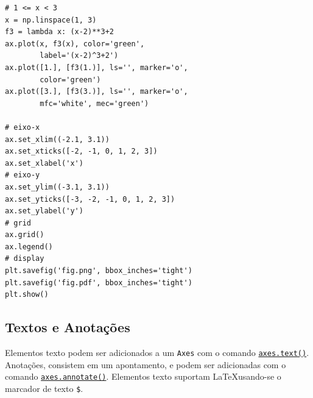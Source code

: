 \begin{ex}
\begin{lstlisting}
# 1 <= x < 3
x = np.linspace(1, 3)
f3 = lambda x: (x-2)**3+2
ax.plot(x, f3(x), color='green',
        label='(x-2)^3+2')
ax.plot([1.], [f3(1.)], ls='', marker='o',
        color='green')
ax.plot([3.], [f3(3.)], ls='', marker='o',
        mfc='white', mec='green')

# eixo-x
ax.set_xlim((-2.1, 3.1))
ax.set_xticks([-2, -1, 0, 1, 2, 3])
ax.set_xlabel('x')
# eixo-y
ax.set_ylim((-3.1, 3.1))
ax.set_yticks([-3, -2, -1, 0, 1, 2, 3])
ax.set_ylabel('y')
# grid
ax.grid()
ax.legend()
# display
plt.savefig('fig.png', bbox_inches='tight')
plt.savefig('fig.pdf', bbox_inches='tight')
plt.show()
\end{lstlisting}
\end{ex}

\subsection{Textos e Anotações}

Elementos texto podem ser adicionados a um \lstinline+Axes+ com o comando \href{https://matplotlib.org/stable/api/_as_gen/matplotlib.axes.Axes.text.html#matplotlib.axes.Axes.text}{\lstinline+axes.text()+}. Anotações, consistem em um apontamento, e podem ser adicionadas com o comando \href{https://matplotlib.org/stable/api/_as_gen/matplotlib.axes.Axes.annotate.html#matplotlib.axes.Axes.annotate}{\lstinline+axes.annotate()+}. Elementos texto suportam \LaTeX usando-se o marcador de texto \lstinline!$!.%


